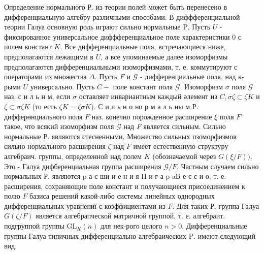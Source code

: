 \documentclass[10pt]{article}
\begin{document}
Определение нормального Р. из теории полей может быть перенесено в дифференциальную алгебру различными способами. В диффференциальной теории Галуа основную роль играют сильно нормальные $\mathrm{P}$. Пусть $U$ - фиксированное универсальное диффференциальное поле характеристики 0 с полем констант $K$. Все дифференциальные поля, встречающиеся ниже, предполагаются лежащими в $U$, а все упоминаемые далее изоморфизмы предполагаются дифференциальными изоморфизмами, т. е. коммутируют с операторами из множества $\Delta$. Пусть $F$ и $\mathcal{G}$ - дифференциальные поля, над к-рыми $U$ универсально. Пусть $C-$ поле констант поля $\mathscr{G}$. Изоморфизм $\sigma$ поля $\mathscr{G}$ наз. с и л ь н м, если $\sigma$ оставляет инвариантным каждый әлемент из $C, \sigma \zeta \subset \zeta K$ и $\zeta \subset \sigma \zeta K$ (то есть $\zeta K=\zeta \sigma K)$. С и л ь н о но р м а л ь ны м Р. дифферөнциального поля $F$ наз. конечно порожденное расширение $\xi$ поля $F$ такое, что всякий изоморфизм поля $\mathscr{G}$ над $F$ является сильным. Сильно нормальные Р. являются стесненными. Множество сильных пзоморфизмов сильно нормального расширения $\mathscr{\zeta}$ над $F$ имеет естественную структуру алгебраич. группы, определенной над полем $K$ (обозначаемой через $G(\xi / F))$. Это - Галуа дифберенциальная группа расширения $\mathscr{G} / F$. Частным случаем сильно нормальных Р. являются $\mathrm{p}$ а с ши и е н и я П и г а p aВ е с с и о, т. е. расширения, сохраняющие поле констант и получающиеся присоединением к полю $F$ базиса решений какой-либо системы линейных однородных дифференциальных уравнениї с коэффициентами из $F$. Для таких Р. группа Галуа $G(\zeta / F)$ является алгебрапческой матричной группой, т. е. алгебраит. подгруппой группы $\mathrm{GL}_{K}(n)$ для нек-рого целого $n>0$. Дифференциальные группы Галуа типичных дифференциально-алгебраических $\mathrm{P}$. имеют следующий вид.
\end{document}
